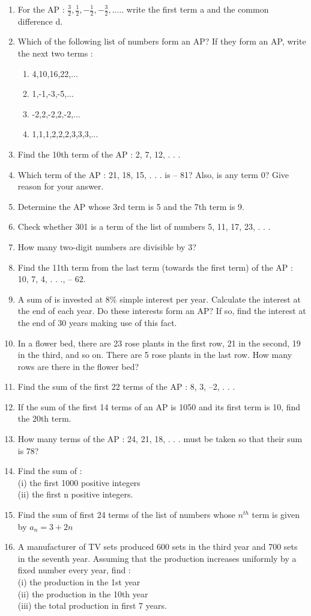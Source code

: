 \renewcommand{\theequation}{\theenumi}
\begin{enumerate}[label=\arabic*.,ref=\thesubsection.\theenumi]
%
\item For the AP :
$\frac{3}{2},\frac{1}{2},-\frac{1}{2},-\frac{3}{2},.....$ write the first term a and the common difference d.
\item Which of the following list of numbers form an AP? If they form an AP,
write the next two terms :
\begin{enumerate}
\item 4,10,16,22,...
\item 1,-1,-3,-5,...
\item -2,2,-2,2,-2,...
\item 1,1,1,2,2,2,3,3,3,...
\end{enumerate}
\item Find the 10th term of the AP : 2, 7, 12, . . .
\item Which term of the AP : 21, 18, 15, . . . is – 81? Also, is any term 0? Give reason for your answer.
\item Determine the AP whose 3rd term is 5 and the 7th term is 9.
\item Check whether 301 is a term of the list of numbers 5, 11, 17, 23, . . .
\item How many two-digit numbers are divisible by 3?
\item Find the 11th term from the last term (towards the first term) of the
AP : 10, 7, 4, . . ., – 62.
\item A sum of  is invested at 8$\%$ simple interest per year. Calculate the interest at the end of each year. Do these interests form an AP? If so, find the interest at the end of 30 years making use of this fact.
\item In a flower bed, there are 23 rose plants in the first row, 21 in the
second, 19 in the third, and so on. There are 5 rose plants in the last row. How many rows are there in the flower bed?
\item Find the sum of the first 22 terms of the AP : 8, 3, –2, . . .
\item If the sum of the first 14 terms of an AP is 1050 and its first term is 10, find the 20th term.
\item How many terms of the AP : 24, 21, 18, . . . must be taken so that their
sum is 78?
\item Find the sum of :\\
(i) the first 1000 positive integers\\
(ii) the first n positive integers.\\
\item Find the sum of first 24 terms of the list of numbers whose $n^{th}$ term is given by $a_n = 3 + 2n$
\item A manufacturer of TV sets produced 600 sets in the third year and 700
sets in the seventh year. Assuming that the production increases uniformly by a fixed number every year, find :\\
(i) the production in the 1st year\\
(ii) the production in the 10th year\\
(iii) the total production in first 7 years.
\end{enumerate}
%
    
